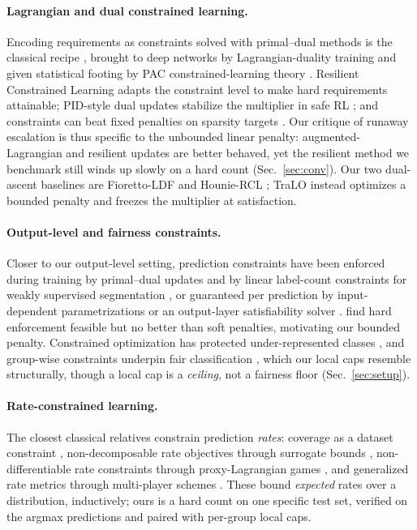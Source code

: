 \documentclass[letterpaper]{article} %
\begin{document}
\paragraph{Lagrangian and dual constrained learning.}
Encoding requirements as constraints solved with primal--dual methods is the
classical recipe \citep{bertsekas1982constrained}, brought to deep networks by
Lagrangian-duality training \citep{fioretto2020lagrangian} and given statistical
footing by PAC constrained-learning theory
\citep{chamon2020probably,chamon2022constrained}. Resilient Constrained Learning
\citep{hounie2023resilient} adapts the constraint level to make hard requirements
attainable; PID-style dual updates stabilize the multiplier in safe RL
\citep{stooke2020responsive}; and constraints can beat fixed penalties on sparsity
targets \citep{gallego2022controlled}. Our critique of runaway escalation is thus
specific to the unbounded linear penalty: augmented-Lagrangian and resilient updates are
better behaved, yet the resilient method we benchmark still winds up slowly on a hard
count (Sec.~\ref{sec:conv}). Our two dual-ascent baselines are Fioretto-LDF
\citep{fioretto2020lagrangian} and Hounie-RCL \citep{hounie2023resilient}; TraLO instead
optimizes a bounded penalty and freezes the multiplier at satisfaction.

\paragraph{Output-level and fairness constraints.}
Closer to our output-level setting, prediction constraints have been enforced
during training by primal--dual updates \citep{nandwani2019primal} and by linear
label-count constraints for weakly supervised segmentation
\citep{pathak2015constrained}, or guaranteed per prediction by
input-dependent parametrizations \citep{brosowsky2021sample} or an output-layer
satisfiability solver \citep{goyal2024deepsade}. \citet{marquez2017imposing} find hard
enforcement feasible but no better than soft penalties, motivating our bounded
penalty. Constrained optimization has protected under-represented classes
\citep{sangalli2021constrained}, and
group-wise constraints underpin fair classification
\citep{bilal2015fairness,agarwal2018reductions}, which our local caps resemble
structurally, though a local cap is a \emph{ceiling}, not a fairness floor
(Sec.~\ref{sec:setup}).

\paragraph{Rate-constrained learning.}
The closest classical relatives constrain prediction \emph{rates}:
coverage as a dataset constraint
\citep{goh2016satisfying}, non-decomposable rate objectives through surrogate bounds
\citep{eban2017scalable}, non-differentiable rate constraints through proxy-Lagrangian
games \citep{cotter2019optimization}, and generalized rate metrics through multi-player
schemes \citep{narasimhan2019optimizing}. These bound \emph{expected} rates over a
distribution, inductively; ours is a hard count on one specific test set, verified on
the argmax predictions and paired with per-group local caps.
\end{document}
